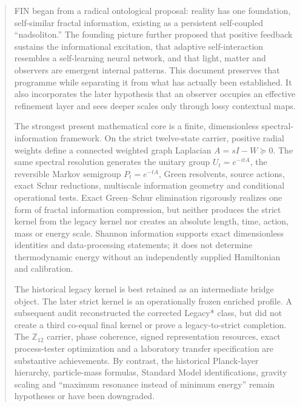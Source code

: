 \documentclass[11pt,a4paper]{article}
\theoremstyle{definition}
\theoremstyle{remark}
\newcommand{\Z}{\mathbb Z}
\begin{document}
\begin{abstract}
FIN began from a radical ontological proposal: reality has one foundation, self-similar fractal information, existing as a persistent self-coupled ``nadsoliton.'' The founding picture further proposed that positive feedback sustains the informational excitation, that adaptive self-interaction resembles a self-learning neural network, and that light, matter and observers are emergent internal patterns. This document preserves that programme while separating it from what has actually been established. It also incorporates the later hypothesis that an observer occupies an effective refinement layer and sees deeper scales only through lossy contextual maps.

The strongest present mathematical core is a finite, dimensionless spectral-information framework. On the strict twelve-state carrier, positive radial weights define a connected weighted graph Laplacian $A=sI-W\succeq0$. The same spectral resolution generates the unitary group $U_t=e^{-itA}$, the reversible Markov semigroup $P_t=e^{-tA}$, Green resolvents, source actions, exact Schur reductions, multiscale information geometry and conditional operational tests. Exact Green--Schur elimination rigorously realizes one form of fractal information compression, but neither produces the strict kernel from the legacy kernel nor creates an absolute length, time, action, mass or energy scale. Shannon information supports exact dimensionless identities and data-processing statements; it does not determine thermodynamic energy without an independently supplied Hamiltonian and calibration.

The historical legacy kernel is best retained as an intermediate bridge object. The later strict kernel is an operationally frozen enriched profile. A subsequent audit reconstructed the corrected Legacy* class, but did not create a third co-equal final kernel or prove a legacy-to-strict completion. The $\Z_{12}$ carrier, phase coherence, signed representation resources, exact process-tester optimization and a laboratory transfer specification are substantive achievements. By contrast, the historical Planck-layer hierarchy, particle-mass formulas, Standard Model identifications, gravity scaling and ``maximum resonance instead of minimum energy'' remain hypotheses or have been downgraded.


\end{abstract}
\end{document}
